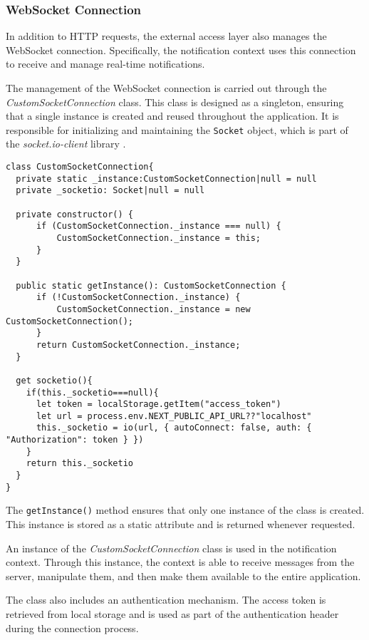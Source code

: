 \subsubsection{WebSocket Connection}\label{subsec:websocketConncetion}
In addition to \gls{HTTP} requests, the external access layer also manages the WebSocket connection. Specifically, the notification context uses this connection to receive and manage real-time notifications.

The management of the WebSocket connection is carried out through the \textit{CustomSocketConnection} class. This class is designed as a singleton, ensuring that a single instance is created and reused throughout the application. It is responsible for initializing and maintaining the \texttt{Socket} object, which is part of the \textit{socket.io-client} library \cite{socketIoClientApi}.

\begin{Verbatim}[fontsize=\small, baselinestretch=0.8]
class CustomSocketConnection{
  private static _instance:CustomSocketConnection|null = null
  private _socketio: Socket|null = null

  private constructor() {
      if (CustomSocketConnection._instance === null) {
          CustomSocketConnection._instance = this;
      }
  }

  public static getInstance(): CustomSocketConnection {
      if (!CustomSocketConnection._instance) {
          CustomSocketConnection._instance = new CustomSocketConnection();
      }
      return CustomSocketConnection._instance;
  }

  get socketio(){
    if(this._socketio===null){
      let token = localStorage.getItem("access_token")
      let url = process.env.NEXT_PUBLIC_API_URL??"localhost"
      this._socketio = io(url, { autoConnect: false, auth: { "Authorization": token } })
    }
    return this._socketio
  }
}
\end{Verbatim}

The \texttt{getInstance()} method ensures that only one instance of the class is created. This instance is stored as a static attribute and is returned whenever requested.

An instance of the \textit{CustomSocketConnection} class is used in the notification context. Through this instance, the context is able to receive messages from the server, manipulate them, and then make them available to the entire application.

The class also includes an authentication mechanism. The access token is retrieved from local storage \cite{mdnLocalStorage} and is used as part of the authentication header during the connection process.


